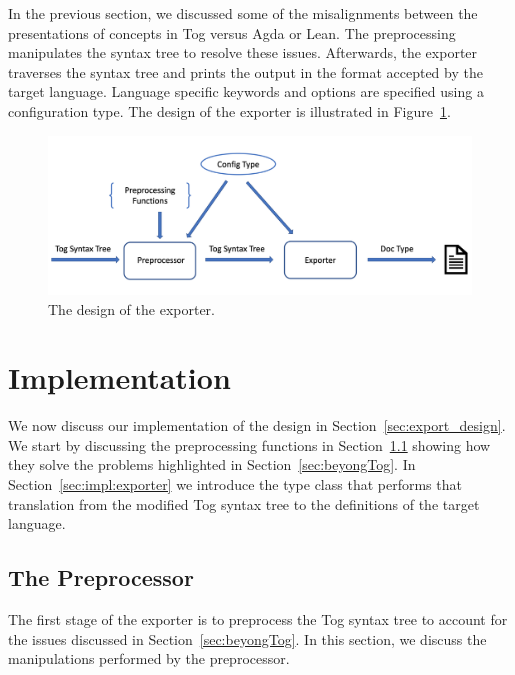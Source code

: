 In the previous section, we discussed some of the misalignments between the presentations of concepts in Tog versus Agda or Lean. 
The preprocessing manipulates the syntax tree to resolve these issues.  
Afterwards, the exporter traverses the syntax tree and prints the output in the format accepted by the target language. Language specific keywords and options are specified using a configuration type. The design of the exporter is illustrated in Figure~\ref{fig:exporter_design}. 
\begin{figure}
\includegraphics[scale=0.3]{figures/exporter_arch.png}
\caption{The design of the exporter.}
\label{fig:exporter_design}
\end{figure}

\section{Implementation}
\label{sec:exporting_agda}

We now discuss our implementation of the design in Section~\ref{sec:export_design}. We start by discussing the preprocessing functions in Section~\ref{sec:exporting:challenges} showing how they solve the problems highlighted in Section~\ref{sec:beyongTog}. In Section~\ref{sec:impl:exporter} we introduce the  type class that performs that translation from the modified Tog syntax tree to the definitions of the target language. 

\subsection{The Preprocessor}
\label{sec:exporting:challenges}
The first stage of the exporter is to preprocess the Tog syntax tree to account for the issues discussed in Section~\ref{sec:beyongTog}. In this section, we discuss the manipulations performed by the preprocessor. 

